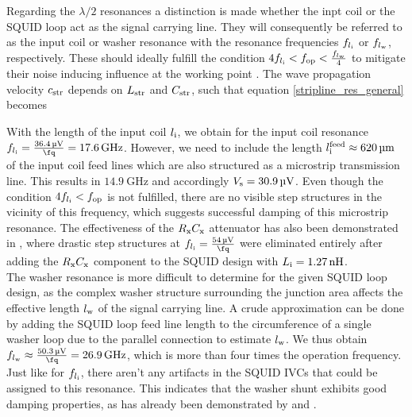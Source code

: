 Regarding the $\lambda/2$ resonances a distinction is made whether the inpt coil or the SQUID loop act as the signal carrying line. They will consequently be referred to as the input coil or washer resonance with the resonance frequencies $f_{l_{\rm i}}$ or $f_{l_{\rm w}}$, respectively. These should ideally fulfill the condition $4f_{l_{\rm i}}<f_{\rm op}<\frac{f_{l_{\rm w}}}{4}$ to mitigate their noise inducing influence at the working point \cite{Can1991}. The wave propagation velocity $c_{\rm str}$ depends on $L_{\rm str}$ and $C_{\rm str}$, such that equation \ref{stripline_res_general} becomes \cite{EnpukuIII1992}        


With the length of the input coil $l_{\rm i}$, we obtain for the input coil resonance $f_{l_{\rm i}}=\frac{\qty{36.4}{\uV}}{\unit{\fq}}=\qty{17.6}{\GHz}$. However, we need to include the length $l_{\rm i}^{\rm feed}\approx \qty{620}{\um}$ of the input coil feed lines which are also structured as a microstrip transmission line. This results in $\qty{14.9}{\GHz}$ and accordingly $V_{\rm s}=\qty{30.9}{\uV}$. Even though the condition $4f_{l_{\rm i}}<f_{\rm op}$ is not fulfilled, there are no visible step structures in the vicinity of this frequency, which suggests successful damping of this microstrip resonance. The effectiveness of the $R_{\rm x}C_{\rm x}$ attenuator has also been demonstrated in \cite{Bauer2022}, where drastic step structures at $f_{l_{\rm i}}=\frac{\qty{54}{\uV}}{\unit{\fq}}$ were eliminated entirely after adding the $R_{\rm x}C_{\rm x}$ component to the SQUID design with $L_{\rm i}=\qty{1.27}{\nH}$. \\
The washer resonance is more difficult to determine for the given SQUID loop design, as the complex washer structure surrounding the junction area affects the effective length $l_{\rm w}$ of the signal carrying line. A crude approximation can be done by adding the SQUID loop feed line length to the circumference of a single washer loop due to the parallel connection to estimate $l_{\rm w}$. We thus obtain $f_{l_{\rm w}}\approx\frac{\qty{50.3}{\uV}}{\unit{\fq}}=\qty{26.9}{\GHz}$, which is more than four times the operation frequency. Just like for $f_{l_{\rm i}}$, there aren't any artifacts in the SQUID IVCs that could be assigned to this resonance. This indicates that the washer shunt exhibits good damping properties, as has already been demonstrated by \cite{Richter2017} and \cite{Bauer2018}. \\

